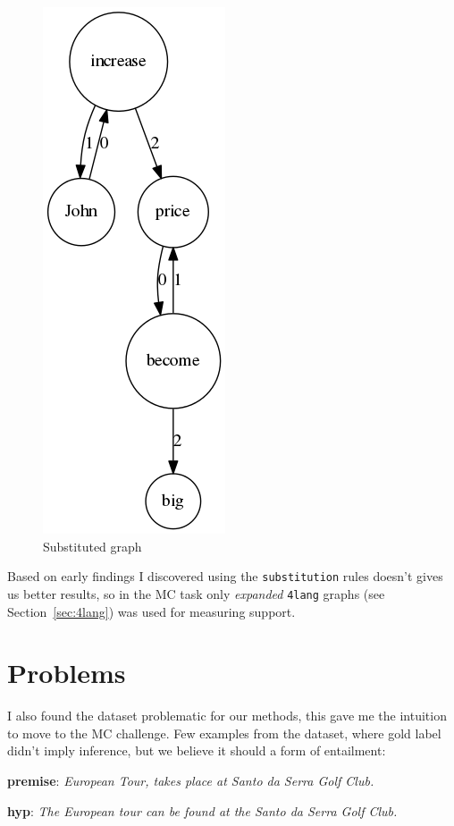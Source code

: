 \begin{figure}
	\centering
	\includegraphics[scale=0.5]{figures/thirdrule3}
	\caption{Substituted graph}
	\label{fig:thirdrule3}
\end{figure}

Based on early findings I discovered using the \texttt{substitution} rules doesn't gives us better results, so in the MC task only \textit{expanded} \texttt{4lang} graphs (see
Section~\ref{sec:4lang}) was used for measuring support. 

\section{Problems}
I also found the dataset problematic for our methods, this gave me the intuition to move to the MC challenge. Few examples from the dataset, where gold label didn't imply inference, but we believe it should a form of entailment:

\textbf{premise}: \textit{European Tour, takes place at Santo da Serra Golf Club.}

\textbf{hyp}: \textit{The European tour can be found at the Santo da Serra Golf Club.}
\newline

